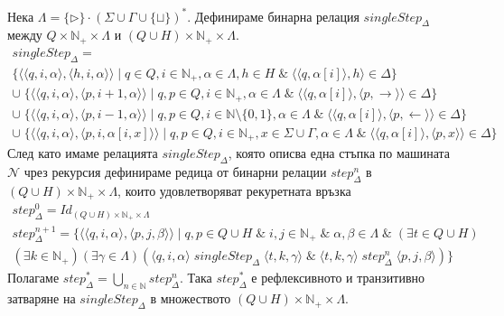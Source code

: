\documentclass[14pt]{extarticle}
\begin{document}
Нека \(\Lambda = \{\triangleright\} \cdot (\Sigma \cup \Gamma \cup \{\sqcup\})^*\).
Дефинираме бинарна релация \(singleStep_\Delta\) \\
между \(Q \times \mathbb{N}_+ \times \Lambda\)  и \((Q \cup H) \times \mathbb{N}_+ \times \Lambda\).
\begin{align*}
    singleStep_\Delta = \\
    \{ \langle \langle q, i, \alpha \rangle, \langle h, i, \alpha \rangle \rangle \mid q \in Q, i \in \mathbb{N}_+, \alpha \in \Lambda, h \in H \;\&\; \langle \langle q, \alpha[i] \rangle, h \rangle \in \Delta  \} \\
    \cup \; \{ \langle \langle q, i, \alpha \rangle, \langle p, i + 1, \alpha \rangle \rangle \mid q, p \in Q, i \in \mathbb{N}_+, \alpha \in \Lambda \;\&\; \langle \langle q, \alpha[i] \rangle, \langle p, \rightarrow \rangle \rangle \in \Delta  \} \\
    \cup \; \{ \langle \langle q, i, \alpha \rangle, \langle p, i - 1, \alpha \rangle \rangle \mid q, p \in Q, i \in \mathbb{N} \setminus \{0, 1\}, \alpha \in \Lambda \;\&\; \langle \langle q, \alpha[i] \rangle, \langle p, \leftarrow \rangle \rangle \in \Delta  \} \\
    \cup \; \{ \langle \langle q, i, \alpha \rangle, \langle p, i, \alpha[i, x] \rangle \rangle \mid q, p \in Q, i \in \mathbb{N}_+, x \in \Sigma \cup \Gamma, \alpha \in \Lambda \;\&\; \langle \langle q, \alpha[i] \rangle, \langle p, x \rangle \rangle \in \Delta  \}
\end{align*}
След като имаме релацията \(singleStep_\Delta\), която описва една стъпка по машината \(\mathcal N\) чрез рекурсия дефинираме редица от бинарни релации \(step_\Delta^n\) в \((Q \cup H) \times \mathbb{N}_+ \times \Lambda\), които удовлетворяват рекуретната връзка
\begin{align*}
    step_\Delta^0 = Id_{(Q \cup H) \times \mathbb{N}_+ \times \Lambda} \\
    step_\Delta^{n + 1} = \{ \langle \langle q, i, \alpha \rangle, \langle p, j, \beta \rangle  \rangle \mid q, p \in Q \cup H \;\&\; i, j \in \mathbb{N}_+ \;\&\; \alpha, \beta \in \Lambda \;\&\; (\exists t \in Q \cup H)\\(\exists k \in \mathbb{N}_+)(\exists \gamma \in \Lambda)( \langle q, i, \alpha \rangle \;singleStep_\Delta\; \langle t, k, \gamma \rangle \;\&\; \langle t, k, \gamma \rangle \;step_\Delta^n\; \langle p, j, \beta \rangle  ) \}
\end{align*}
Полагаме \(step_\Delta^* = \displaystyle\bigcup_{n \in \mathbb N} step_\Delta^n \). Така \(step_\Delta^*\) е рефлексивното и транзитивно затваряне на \(singleStep_\Delta\) в множеството \((Q \cup H) \times \mathbb{N}_+ \times \Lambda\). \\
\end{document}

